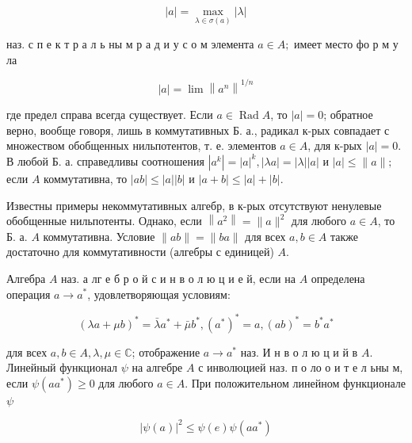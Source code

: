 \documentclass[10pt]{article}
\begin{document}
\[

|a|=\max _{\lambda \in \sigma(a)}|\lambda|

\]



наз. с п е к т р а л ь ны м р а д и у с о м элемента $a \in A ;$ имеет место фо р м у ла



\[

|a|=\lim \left\|a^{n}\right\|^{1 / n}

\]



где предел справа всегда существует. Если $a \in \operatorname{Rad} A$, то $|a|=0$; обратное верно, вообще говоря, лишь в коммутативных Б. а., радикал к-рых совпадает с множеством обобщенных нильпотентов, т. е. элементов $a \in A$, для к-рых $|a|=0$. В любой Б. а. справедливы соотношения $\left|a^{k}\right|=|a|^{k},|\lambda a|=|\lambda||a|$ и $|a| \leqslant\|a\| ;$ если $A$ коммутативна, то $|a b| \leqslant|a||b|$ и $|a+b| \leqslant|a|+|b|$.



Известны примеры некоммутативных алгебр, в к-рых отсутствуют ненулевые обобщенные нильпотенты. Однако, если $\left\|a^{2}\right\|=\|a\|^{2}$ для любого $a \in A$, то Б. а. $A$ коммутативна. Условие $\|a b\|=\|b a\|$ для всех $a, b \in A$ также достаточно для коммутативности (алгебры с единицей) $A$.



Алгебра $A$ наз. а лг е б р о й с и н в о л ю ц и е й, если на $A$ определена операция $a \rightarrow a^{*}$, удовлетворяющая условиям:



\[

(\lambda a+\mu b)^{*}=\bar{\lambda} a^{*}+\bar{\mu} b^{*},\left(a^{*}\right)^{*}=a,(a b)^{*}=b^{*} a^{*}

\]



для всех $a, b \in A, \lambda, \mu \in \mathbb{C}$; отображение $a \rightarrow a^{*}$ наз. И н в о л ю ц и й в $A$. Линейный функционал $\psi$ на алгебре $A$ с инволюцией наз. п о ло о и т е л ьны м, если $\psi\left(a a^{*}\right) \geqslant 0$ для любого $a \in A$. При положительном линейном функционале $\psi$



\[

|\psi(a)|^{2} \leqslant \psi(e) \psi\left(a a^{*}\right)

\]
\end{document}
